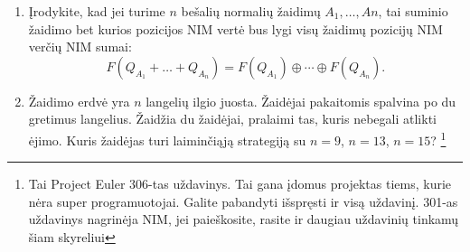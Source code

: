 \begin{enumerate}
  \item Įrodykite, kad jei turime $n$ bešalių normalių žaidimų $A_{1},
    \ldots, A{n}$, tai suminio žaidimo bet kurios pozicijos NIM vertė bus
    lygi visų žaidimų pozicijų NIM verčių NIM sumai: $$F(Q_{A_{1}} + \ldots
    + Q_{A_{n}}) = F(Q_{A_{1}}) \oplus \cdots \oplus F(Q_{A_{n}}).$$

  \item Žaidimo erdvė yra $n$ langelių ilgio juosta. Žaidėjai pakaitomis spalvina
    po du gretimus langelius. Žaidžia du žaidėjai, pralaimi tas, kuris nebegali
    atlikti ėjimo. Kuris žaidėjas turi laiminčiąją strategiją su $n=9$, $n=13$,
    $n=15$? \footnote{Tai Project Euler 306-tas uždavinys. Tai gana įdomus projektas
    tiems, kurie nėra super programuotojai. Galite pabandyti išspręsti ir visą
    uždavinį. 301-as uždavinys nagrinėja NIM, jei paieškosite, rasite ir
    daugiau uždavinių tinkamų šiam skyreliui}




\end{enumerate}
